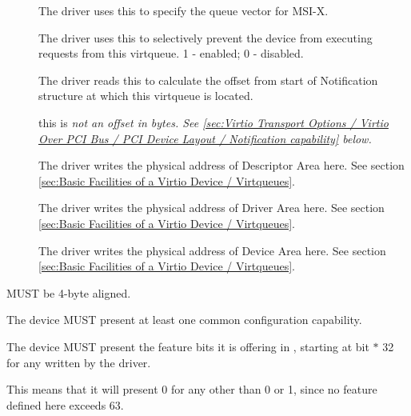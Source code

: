 \begin{description}
\item[]
        The driver uses this to specify the queue vector for MSI-X.

\item[]
        The driver uses this to selectively prevent the device from executing requests from this virtqueue.
        1 - enabled; 0 - disabled.

\item[]
        The driver reads this to calculate the offset from start of Notification structure at
        which this virtqueue is located.
        \begin{note} this is \em{not} an offset in bytes.
        See \ref{sec:Virtio Transport Options / Virtio Over PCI Bus / PCI Device Layout / Notification capability} below.
        \end{note}

\item[]
        The driver writes the physical address of Descriptor Area here.  See section \ref{sec:Basic Facilities of a Virtio Device / Virtqueues}.

\item[]
        The driver writes the physical address of Driver Area here.  See section \ref{sec:Basic Facilities of a Virtio Device / Virtqueues}.

\item[]
        The driver writes the physical address of Device Area here.  See section \ref{sec:Basic Facilities of a Virtio Device / Virtqueues}.
\end{description}

 MUST be 4-byte aligned.

The device MUST present at least one common configuration capability.

The device MUST present the feature bits it is offering in , starting at bit  $*$ 32 for any  written by the driver.
\begin{note}
  This means that it will present 0 for any  other than 0 or 1, since no feature defined here exceeds 63.
\end{note}

